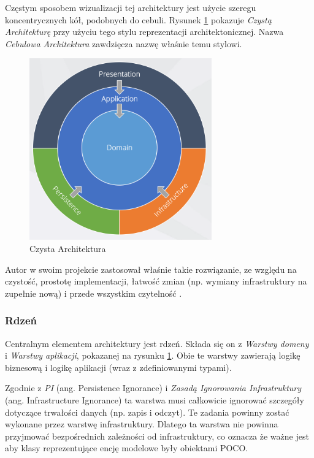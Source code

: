\documentclass[12pt]{article}
\numberwithin{figure}{section}
\begin{document}
    Częstym sposobem wizualizacji tej architektury jest użycie szeregu koncentrycznych kół, podobnych do cebuli. Rysunek \ref{fig:clean-architecture} pokazuje \textit{Czystą Architekturę} przy użyciu tego stylu reprezentacji architektonicznej. Nazwa \textit{Cebulowa Architektura} zawdzięcza nazwę właśnie temu stylowi. 
    
    \begin{figure}[H] 
     	\centering
    	\includegraphics[width=0.7\textwidth]{images/chapter_3/clean-architecture.png}
    	\caption{Czysta Architektura \cite{clean-architecture}}
    	\label{fig:clean-architecture}
    \end{figure}
    
    Autor w swoim projekcie zastosował właśnie takie rozwiązanie, ze względu na czystość, prostotę implementacji, łatwość zmian (np. wymiany infrastruktury na zupełnie nową) i przede wszystkim czytelność \cite{clean-architecture}. 

        \subsubsection{Rdzeń}
        Centralnym elementem architektury jest rdzeń. Składa się on z \textit{Warstwy domeny} i \textit{Warstwy aplikacji}, pokazanej na rysunku \ref{fig:clean-architecture}. Obie te warstwy zawierają logikę biznesową i logikę aplikacji (wraz z zdefiniowanymi typami). 
        
        Zgodnie z \textit{PI} (ang. Persistence Ignorance) i \textit{Zasadą Ignorowania Infrastruktury} (ang.  Infrastructure Ignorance) ta warstwa musi całkowicie ignorować szczegóły dotyczące trwałości danych (np. zapis i odczyt). Te zadania powinny zostać wykonane przez warstwę infrastruktury. Dlatego ta warstwa nie powinna przyjmować bezpośrednich zależności od infrastruktury, co oznacza że ważne jest aby klasy reprezentujące encję modelowe były obiektami POCO.
        
\end{document}
